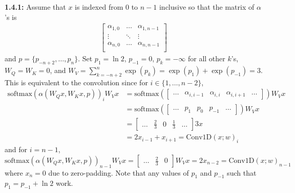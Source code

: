 \documentclass[12pt]{article}
\begin{document}
\textbf{1.4.1:} Assume that $x$ is indexed from 0 to $n-1$ inclusive so that the matrix of $\alpha$'s is \begin{align*} \begin{bmatrix}
    \alpha_{1,0} & \ldots & \alpha_{1,n-1}\\
    \vdots & \ddots & \vdots\\
    \alpha_{n,0} & \ldots & \alpha_{n,n-1}\\
\end{bmatrix} \end{align*} and $p = \{p_{-n+2},\ldots,p_n\}$. Set $p_1 = \ln 2$, $p_{-1} = 0$, $p_k = -\infty$ for all other $k$'s, $W_Q = W_K = 0$, and $W_V = \sum_{k=-n+2}^n \exp(p_k) = \exp(p_1) + \exp(p_{-1}) = 3$. This is equivalent to the convolution since for $i \in \{1,\ldots,n-2\}$, \begin{align*}
     \text{softmax}(\alpha(W_Qx,W_Kx,p))_i W_Vx &= \text{softmax} (\begin{bmatrix} \ldots & \alpha_{i,i-1} & \alpha_{i,i} & \alpha_{i,i+1} & \ldots \end{bmatrix}) W_Vx \\
     &= \text{softmax} (\begin{bmatrix} \ldots & p_1 & p_0 & p_{-1} & \ldots \end{bmatrix}) W_Vx\\
     &= \begin{bmatrix} \ldots & \frac{2}{3} & 0 & \frac{1}{3} & \ldots \end{bmatrix} 3x\\
    &= 2x_{i-1} + x_{i+1} = \text{Conv1D}(x;w)_i
\end{align*} and for $i = n-1$, $\text{softmax}(\alpha(W_Qx,W_Kx,p))_{n-1} W_Vx = \begin{bmatrix} \ldots & \frac{2}{3} & 0 \end{bmatrix} W_Vx = 2x_{n-2} = \text{Conv1D}(x;w)_{n-1}$ where $x_n = 0$ due to zero-padding. Note that any values of $p_1$ and $p_{-1}$ such that $p_1 = p_{-1} + \ln 2$ work.
\end{document}
